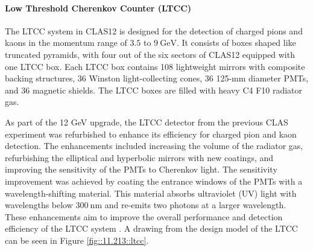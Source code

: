 \paragraph{Low Threshold Cherenkov Counter (LTCC)}
    The LTCC system in CLAS12 is designed for the detection of charged pions and kaons in the momentum range of $3.5$ to $9 ~\text{GeV}$.
    It consists of boxes shaped like truncated pyramids, with four out of the six sectors of CLAS12 equipped with one LTCC box.
    Each LTCC box contains 108 lightweight mirrors with composite backing structures, 36 Winston light-collecting cones, 36 125-mm diameter PMTs, and 36 magnetic shields.
    The LTCC boxes are filled with heavy C4 F10 radiator gas.

    As part of the 12 GeV upgrade, the LTCC detector from the previous CLAS experiment was refurbished to enhance its efficiency for charged pion and kaon detection.
    The enhancements included increasing the volume of the radiator gas, refurbishing the elliptical and hyperbolic mirrors with new coatings, and improving the sensitivity of the PMTs to Cherenkov light.
    The sensitivity improvement was achieved by coating the entrance windows of the PMTs with a wavelength-shifting material.
    This material absorbs ultraviolet (UV) light with wavelengths below $300 ~\text{nm}$ and re-emits two photons at a larger wavelength.
    These enhancements aim to improve the overall performance and detection efficiency of the LTCC system \cite{ungaro2020}.
    A drawing from the design model of the LTCC can be seen in Figure \ref{fig::11.213::ltcc}.
